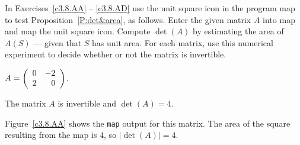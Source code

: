 \documentclass{ximera}
\begin{document}
\noindent  In Exercises~\ref{c3.8.AA} -- \ref{c3.8.AD} use the {\sf unit 
square} icon in the program {\sf map} to test Proposition~\ref{P:det&area}, as 
follows. Enter the given matrix $A$ into {\sf map} and map the {\sf unit 
square} icon.  Compute $\det(A)$ by estimating the area of $A(S)$ --- given 
that $S$ has unit area.  For each matrix, use this numerical experiment to 
decide whether or not the matrix is invertible.
\begin{exercise}  \label{c3.8.AA}
$A=\left(\begin{array}{rr} 0 & -2\\ 2 &0\end{array}\right)$.

\begin{solution}
\ans The matrix $A$ is invertible and $\det(A) = 4$.

\soln Figure~\ref{c3.8.AA} shows the {\tt map} output for this matrix.
The area of the square resulting from the map is $4$, so $|\det(A)| = 4$.

\end{solution}
\end{exercise}
\end{document}
